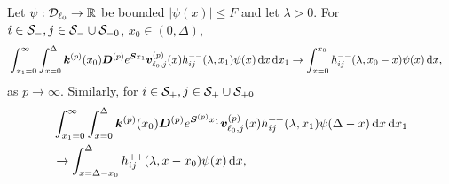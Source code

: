 \begin{lem}\label{lem: ppp}
	Let \(\psi:\mathcal{D}_{\ell_0}\to \mathbb R\) be bounded \(|\psi(x)|\leq F\) and let \(\lambda >0\). For \(i\in\mathcal S_-,j\in\mathcal S_-\cup\mathcal{S}_{-0}\), \(x_0\in(0,\Delta)\), 
	\begin{align}
		&\int_{x_1=0}^\infty \int_{x=0}^{\Delta}\boldsymbol k^{(p)}(x_0) \boldsymbol D^{(p)} e^{\boldsymbol S x_1} {\boldsymbol v}_{\ell_0,j}^{(p)}(x) h_{ij}^{--}(\lambda, x_1) \psi(x) \, \mathrm{d} x \, \mathrm{d} x_1  
		\to \int_{x=0}^{x_0} h_{ij}^{--}(\lambda,x_0-x)\psi(x)\, \mathrm{d} x, \label{eqn: LLLlllL}
	\end{align}
	as \(p\to\infty\). Similarly, for \(i\in\mathcal S_+,j\in\mathcal S_+\cup\mathcal{S}_{+0}\)
	\begin{align}
		&\int_{x_1=0}^\infty \int_{x=0}^{\Delta}\boldsymbol k^{(p)}(x_0) \boldsymbol D^{(p)} e^{\boldsymbol S^{(p)} x_1} {\boldsymbol v}_{\ell_0,j}^{(p)}(x) h_{ij}^{++}(\lambda, x_1) \psi(\Delta-x) \, \mathrm{d} x \, \mathrm{d} x_1  \nonumber 
		\\&\to\int_{x=\Delta-x_0}^{\Delta} h_{ij}^{++}(\lambda,x-x_0)\psi(x)\, \mathrm{d} x, \label{eqn: LLLlllL2222}
	\end{align}
\end{lem}
